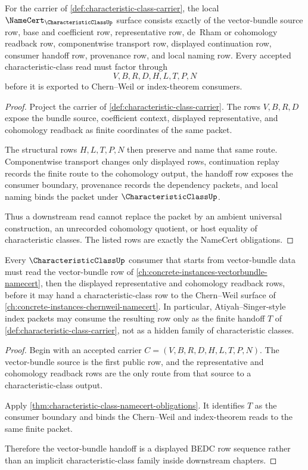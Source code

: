\begin{theorem}
\label{thm:characteristic-class-namecert-obligations}
For the carrier of \autoref{def:characteristic-class-carrier}, the local $\NameCert_{\CharacteristicClassUp}$ surface consists exactly of the vector-bundle source row, base and coefficient row, representative row, de~Rham or cohomology readback row, componentwise transport row, displayed continuation row, consumer handoff row, provenance row, and local naming row. Every accepted characteristic-class read must factor through
$$
V,B,R,D,H,L,T,P,N
$$
before it is exported to Chern--Weil or index-theorem consumers.
\end{theorem}
\begin{proof}
Project the carrier of \autoref{def:characteristic-class-carrier}. The rows $V,B,R,D$ expose the bundle source, coefficient context, displayed representative, and cohomology readback as finite coordinates of the same packet.

The structural rows $H,L,T,P,N$ then preserve and name that same route. Componentwise transport changes only displayed rows, continuation replay records the finite route to the cohomology output, the handoff row exposes the consumer boundary, provenance records the dependency packets, and local naming binds the packet under $\CharacteristicClassUp$.

Thus a downstream read cannot replace the packet by an ambient universal construction, an unrecorded cohomology quotient, or host equality of characteristic classes. The listed rows are exactly the NameCert obligations.
\end{proof}

\begin{theorem}
\label{thm:characteristic-class-vector-bundle-handoff}
Every $\CharacteristicClassUp$ consumer that starts from vector-bundle data must read the vector-bundle row of \autoref{ch:concrete-instances-vectorbundle-namecert}, then the displayed representative and cohomology readback rows, before it may hand a characteristic-class row to the Chern--Weil surface of \autoref{ch:concrete-instances-chernweil-namecert}. In particular, Atiyah--Singer-style index packets may consume the resulting row only as the finite handoff $T$ of \autoref{def:characteristic-class-carrier}, not as a hidden family of characteristic classes.
\end{theorem}
\begin{proof}
Begin with an accepted carrier $C=(V,B,R,D,H,L,T,P,N)$. The vector-bundle source is the first public row, and the representative and cohomology readback rows are the only route from that source to a characteristic-class output.

Apply \autoref{thm:characteristic-class-namecert-obligations}. It identifies $T$ as the consumer boundary and binds the Chern--Weil and index-theorem reads to the same finite packet.

Therefore the vector-bundle handoff is a displayed BEDC row sequence rather than an implicit characteristic-class family inside downstream chapters.
\end{proof}


